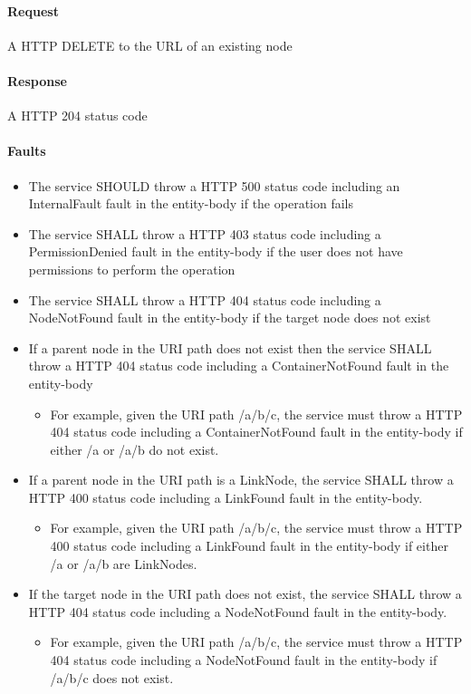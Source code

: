 \documentclass[11pt,a4paper]{ivoa}
\begin{document}
\paragraph{Request}
A HTTP DELETE to the URL of an existing node

\paragraph{Response}
A HTTP 204 status code

\paragraph{Faults}
\begin{itemize}
    \item The service SHOULD throw a HTTP 500 status code including an InternalFault fault in the entity-body if the operation fails
    \item The service SHALL throw a HTTP 403 status code including a PermissionDenied fault in the entity-body if the user does not have permissions to perform the operation
    \item The service SHALL throw a HTTP 404 status code including a NodeNotFound fault in the entity-body if the target node does not exist
    \item If a parent node in the URI path does not exist then the service SHALL throw a HTTP 404 status code including a ContainerNotFound fault in the entity-body
    \begin{itemize}
        \item For example, given the URI path /a/b/c, the service must throw a HTTP 404 status code including a ContainerNotFound fault in the entity-body if either /a or /a/b do not exist.
    \end{itemize}
    \item If a parent node in the URI path is a LinkNode, the service SHALL throw a HTTP 400 status code including a LinkFound fault in the entity-body.
    \begin{itemize}
        \item For example, given the URI path /a/b/c, the service must throw a HTTP 400 status code including a LinkFound fault in the entity-body if either /a or /a/b are LinkNodes.
    \end{itemize}
    \item If the target node in the URI path does not exist, the service SHALL throw a HTTP 404 status code including a NodeNotFound fault in the entity-body.
    \begin{itemize}
        \item For example, given the URI path /a/b/c, the service must throw a HTTP 404 status code including a NodeNotFound fault in the entity-body if /a/b/c does not exist.
    \end{itemize}
\end{itemize}
\end{document}
